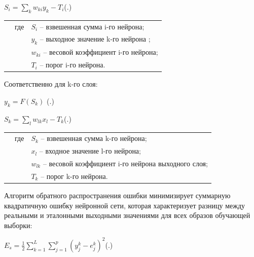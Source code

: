 	\formulaspace \par \redline 
	$S_{i} = \sum \limits _{k}^{} w_{ki}y_{k} - T_{i}$\hfill (\thechaptercntr .\theformulacntr) \redline
	\formulaspace \addtocounter{formulacntr}{1}
	
	\begin{tabular}{p{}p{}p{}}
		& где  & $S_{i}$ {--} взвешенная сумма i-го нейрона; \\
		&      & $y_{k}$ {--} выходное значение k-го нейрона ; \\
		&      & $w_{ki}$ {--} весовой коэффициент i-го нейрона; \\
		&      & $T_{i}$ {--} порог i-го нейрона. \\
	\end{tabular}
	
    \par \redline 	Соответственно для k-го слоя:
	
	\formulaspace \par \redline 
	$y_{k} = F(S_{k}) $
	\hfill (\thechaptercntr .\theformulacntr) \redline
	\formulaspace \addtocounter{formulacntr}{1}
	
	\formulaspace \par \redline 
	$S_{k} = \sum \limits _{l}^{} w_{lk}x_{l} - T_{k}$\hfill (\thechaptercntr .\theformulacntr) \redline
	\formulaspace \addtocounter{formulacntr}{1}
	
	\begin{tabular}{p{}p{}p{}}
		& где  & $S_{k}$ {--} взвешенная сумма k-го нейрона; \\
		&      & $x_{l}$ {--} входное значение l-го нейрона; \\
		&      & $w_{lk}$ {--} весовой коэффициент i-го нейрона выходного слоя; \\
		&      & $T_{k}$ {--} порог k-го нейрона. \\
	\end{tabular}
	
	\par \redline Алгоритм обратного распространения ошибки минимизирует суммарную квадратичную ошибку нейронной сети, которая характеризует разницу между реальными и эталонными выходными значениями для всех образов обучающей выборки:
	
	\formulaspace \par \redline 
	$E_{s} = \frac{1}{2}\sum \limits _{k=1}^{L} \sum \limits _{j=1}^{p} (y_{j}^{k} - e_{j}^{k})^{2} $\hfill (\thechaptercntr .\theformulacntr) \redline
	\formulaspace \addtocounter{formulacntr}{1}
	
